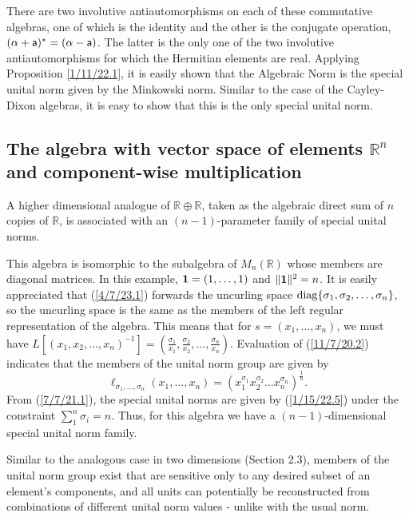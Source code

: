 \documentclass{amsart}
\numberwithin{equation}{section}
\theoremstyle{definition}
\numberwithin{theorem}{section}
\begin{document}
 There are two involutive antiautomorphisms on each of these commutative algebras, one of which is the identity and the other is the conjugate operation, $(\alpha+ {\sf a})^* = (\alpha- {\sf a})$. The latter is the only one of the two involutive antiautomorphisms  for which the Hermitian elements are real.  Applying Proposition \ref{1/11/22.1}, it is easily shown that the Algebraic Norm is the special unital norm given by the Minkowski norm.  Similar to the case of the Cayley-Dixon algebras, it is easy to show that this is the only special unital norm.

 
 \subsection{The algebra with vector space of elements $\mathbb{R}^n$ and component-wise multiplication} A higher dimensional analogue of $\mathbb{R}\oplus \mathbb{R}$, taken as the algebraic direct sum of $n$ copies of $\mathbb{R}$, is associated with an $(n-1)$-parameter family of  special unital norms.

 This algebra is isomorphic to the subalgebra of $ M_n(\mathbb{R})$  whose members are diagonal matrices. In this example, ${\bf 1} = (1,\dots,1)$ and $\|{\bf 1}\|^2 = n$.   It is easily appreciated that (\ref{4/7/23.1}) forwards the uncurling space ${\rm diag} \{ \sigma_1, \sigma_2,\dots,\sigma_n\}$, so the uncurling space is the same as the members of the left regular representation of the algebra.  This means that for $s=(x_1,\dots,x_n)$, we must have $L[(x_1,x_2,\dots,x_n)^{-1}] = (\frac{\sigma_1}{x_1}, \frac{\sigma_2}{x_2},\dots,\frac{\sigma_n}{x_n})$.     Evaluation of (\ref{11/7/20.2}) indicates that the members of the unital norm group are given by  \begin{equation}\label{1/15/22.5} \ell_{\sigma_1,\dots,\sigma_n}(x_1,\dots,x_n) = (x_1^{\sigma_1} x_2^{\sigma_2} \dots x_n^{\sigma_n})^\frac{1}{n}. \end{equation} From (\ref{7/7/21.1}), the special unital norms are given by (\ref{1/15/22.5}) under the constraint $\sum_1^n \sigma_i = n$. Thus, for this algebra we have a $(n-1)$-dimensional special unital norm family.   
 
 Similar to the analogous case in two dimensions (Section 2.3), members of the unital norm group exist that are sensitive only to any desired subset of an element's components, and all units can potentially be reconstructed from combinations of different unital norm values - unlike with the usual norm.
 
\end{document}
